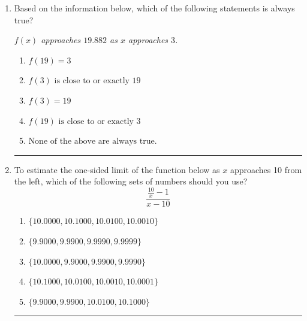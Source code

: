 \documentclass[14pt]{extbook}
\newcommand{\litem}[1]{\item#1\hspace*{-1cm}\rule{\textwidth}{0.4pt}}
\begin{document}
\begin{enumerate}
{\begin{enumerate}[label=\Alph*.]
\end{enumerate} }
\litem{
Based on the information below, which of the following statements is always true?
\begin{center}
    \textit{ $f(x)$ approaches $19.882$ as $x$ approaches $3$. }
\end{center}
\begin{enumerate}[label=\Alph*.]
\item \( f(19) = 3 \)
\item \( f(3) \text{ is close to or exactly } 19 \)
\item \( f(3) = 19 \)
\item \( f(19) \text{ is close to or exactly } 3 \)
\item \( \text{None of the above are always true.} \)

\end{enumerate} }
\litem{
To estimate the one-sided limit of the function below as $x$ approaches 10 from the left, which of the following sets of numbers should you use?\[ \frac{\frac{10}{x} - 1}{x - 10} \]\begin{enumerate}[label=\Alph*.]
\item \( \{ 10.0000, 10.1000, 10.0100, 10.0010 \} \)
\item \( \{ 9.9000, 9.9900, 9.9990, 9.9999 \} \)
\item \( \{ 10.0000, 9.9000, 9.9900, 9.9990 \} \)
\item \( \{ 10.1000, 10.0100, 10.0010, 10.0001 \} \)
\item \( \{ 9.9000, 9.9900, 10.0100, 10.1000 \} \)

\end{enumerate} }
\end{enumerate}
\end{document}
